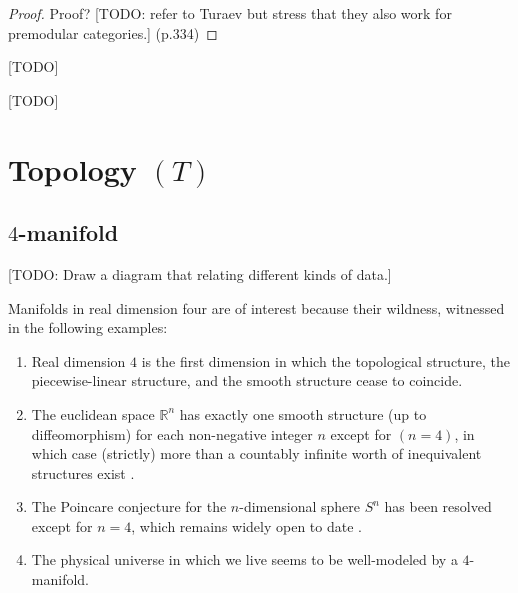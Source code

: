 \begin{proof}
  Proof?
  [TODO: refer to Turaev but stress that they also work for premodular categories.] (p.334)
\end{proof}

\begin{definition}[$10$j-symbol]\label{def/10j-symbol}
  [TODO]
\end{definition}

\begin{definition}[$15$j-symbol]\label{def/15j-symbol}
  [TODO]
\end{definition}


\section{Topology $(T)$}
\subsection{$4$-manifold}

[TODO: Draw a diagram that relating different kinds of data.]

Manifolds in real dimension four are of interest because their
wildness, witnessed in the following examples:

\begin{enumerate}
  \item Real dimension $4$ is the first dimension in which the
        topological structure, the piecewise-linear structure,
        and the smooth structure cease to coincide.
  \item The euclidean space $\mathbb{R}^{n}$ has exactly one
        smooth structure (up to diffeomorphism) for each
        non-negative integer $n$ except for $(n=4)$, in which
        case (strictly) more than a countably infinite worth of
        inequivalent structures exist \cite{?}.
  \item The Poincare conjecture for the $n$-dimensional sphere
        $S^{n}$ has been resolved except for $n=4$, which remains
        widely open to date \cite{?}.
  \item The physical universe in which we live seems to be
        well-modeled by a $4$-manifold.
\end{enumerate}


